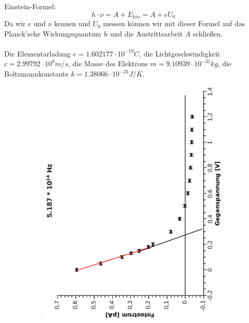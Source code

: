 \documentclass[12pt]{article}
\begin{document}

Einstein-Formel:
$$h\cdot\nu=A+E_{kin}=A+eU_0$$
Da wir $e$ und $\nu$ kennen und $U_0$ messen können wir mit dieser Formel auf das Planck'sche Wirkungsquantum $h$ und die Austrittsarbeit $A$ schließen.\\
\\
Die Elementarladung $e=1.602177 \cdot 10^{-19}C$, die Lichtgeschwindigkeit $c=2.99792 \cdot 10^8 m/s$, die Masse des Elektrons $m=9.10939 \cdot 10^{-31}kg$, die Boltzmannkonstante $k=1.38066 \cdot 10^{-23}J/K$.

\begin{figure}
\centering
\begin{subfigure}{0.48\linewidth}
\includegraphics[width=0.75\linewidth, angle=-90]{5187.eps}
\end{subfigure}
\begin{subfigure}{0.48\linewidth}

\end{subfigure}
\end{figure}
\end{document}
